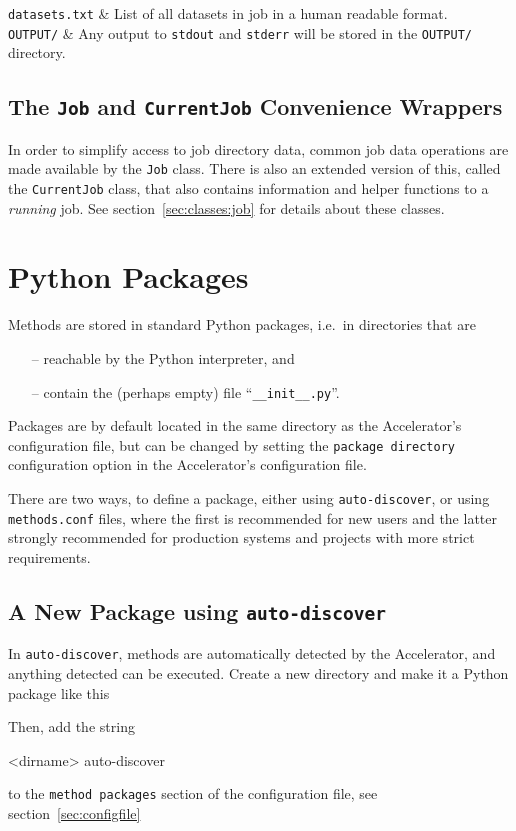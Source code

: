 \texttt{datasets.txt} & List of all datasets in job in a human
readable format.\\

\texttt{OUTPUT/} & Any output to \texttt{stdout} and \texttt{stderr} will be
stored in the \texttt{OUTPUT/} directory.\\
\stoptabletwo



\subsection{The \texttt{Job} and \texttt{CurrentJob} Convenience Wrappers}
In order to simplify access to job directory data, common job data
operations are made available by the \texttt{Job} class.  There is
also an extended version of this, called the \texttt{CurrentJob}
class, that also contains information and helper functions to a
\textsl{running} job.  See section~\ref{sec:classes:job} for details about
these classes.



\section{Python Packages}
Methods are stored in standard Python packages, i.e.\ in directories
that are
\begin{itemize}
\item[--] reachable by the Python interpreter, and
\item[--] contain the (perhaps empty) file ``\texttt{\_\_init\_\_.py}''.
\end{itemize}
Packages are by default located in the same directory as the
Accelerator's configuration file, but can be changed by setting
the \texttt{package directory} configuration option in the
Accelerator's configuration file.

There are two ways, to define a package, either
using \texttt{auto-discover}, or using \texttt{methods.conf} files,
where the first is recommended for new users and the latter strongly
recommended for production systems and projects with more strict
requirements.


\subsection{A New Package using \texttt{auto-discover}}
In \texttt{auto-discover}, methods are automatically detected by the
Accelerator, and anything detected can be executed.  Create a new
directory and make it a Python package like this
\begin{shell}
\end{shell}
Then, add the string
\begin{shell}
<dirname> auto-discover
\end{shell}
to the \texttt{method packages} section of the
configuration file, see section~\ref{sec:configfile}



